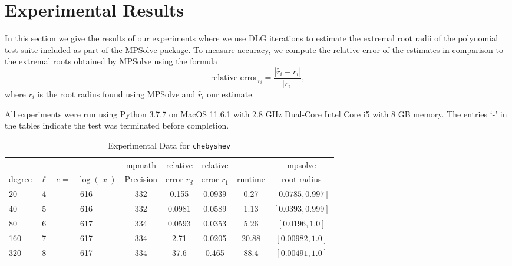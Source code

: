 \documentclass[sigconf]{acmart}
\begin{document}
\section{Experimental Results}\label{sec:exp}

In this section we give the results of our experiments where we use DLG iterations to estimate the extremal root radii of the polynomial test suite included as part of the MPSolve package. To measure accuracy, we compute the relative error of the estimates in comparison to the extremal roots obtained by MPSolve using the formula
$$
\text{relative error}_{r_i} = \frac{|\tilde{r_i} - r_i|}{|r_i|},
$$
where $r_i$ is the root radius found using MPSolve and $\tilde{r_i}$ our estimate.

All experiments were run using Python 3.7.7 on MacOS 11.6.1 with 2.8 GHz Dual-Core Intel Core i5 with 8 GB memory.  The entries `-' in the tables indicate the test was terminated before completion. 

\begin{table}[t]
\caption{Experimental Data for \texttt{chebyshev}} %
\label{tab:chebyshev}
\vskip -0.15in
\begin{center}
\begin{small}
\begin{sc}
\begin{tabular}{lccccccc}
\toprule
&  &  & mpmath & relative  & relative &  & mpsolve \\
degree  & $\ell$& $e=-\log(|x|)$& Precision &error $r_d$       & error $r_1$ &runtime& root radius\\
\midrule
 20 & 4 & 616 & 332 & 0.155 & 0.0939 & 0.27 & $[0.0785, 0.997]$\\
 40 & 5 & 616 & 332 & 0.0981 & 0.0589 & 1.13 & $[0.0393, 0.999]$\\
 80 & 6 & 617 & 334 & 0.0593 & 0.0353 & 5.26 & $[0.0196, 1.0]$\\
 160 & 7 & 617 & 334 & 2.71 & 0.0205 & 20.88 & $[0.00982, 1.0]$\\
 320 & 8 & 617 & 334 & 37.6 & 0.465 & 88.4 & $[0.00491, 1.0]$\\
\bottomrule
\end{tabular}
\end{sc}
\end{small}
\end{center}
\vskip 0.05in
\end{table}
\end{document}
